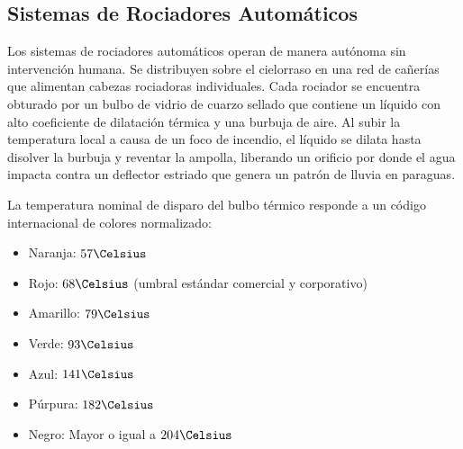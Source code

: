 \subsection{Sistemas de Rociadores Automáticos}

Los sistemas de rociadores automáticos operan de manera autónoma sin intervención humana. Se distribuyen sobre el cielorraso
en una red de cañerías que alimentan cabezas rociadoras individuales. Cada rociador se encuentra obturado por un bulbo de
vidrio de cuarzo sellado que contiene un líquido con alto coeficiente de dilatación térmica y una burbuja de aire. Al subir
la temperatura local a causa de un foco de incendio, el líquido se dilata hasta disolver la burbuja y reventar la ampolla,
liberando un orificio por donde el agua impacta contra un deflector estriado que genera un patrón de lluvia en paraguas.

La temperatura nominal de disparo del bulbo térmico responde a un código internacional de colores normalizado:
\begin{itemize}
    \item Naranja: $57\Celsius$
    \item Rojo: $68\Celsius$ (umbral estándar comercial y corporativo)
    \item Amarillo: $79\Celsius$
    \item Verde: $93\Celsius$
    \item Azul: $141\Celsius$
    \item Púrpura: $182\Celsius$
    \item Negro: Mayor o igual a $204\Celsius$
\end{itemize}


